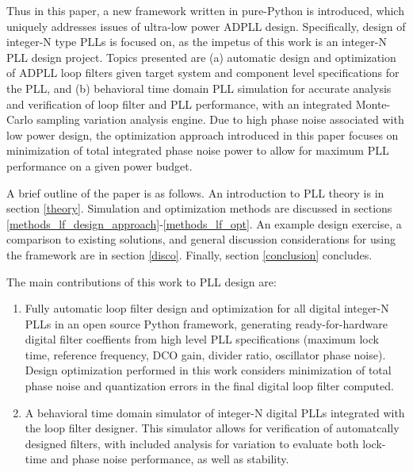 Thus in this paper, a new framework written in pure-Python is introduced, which uniquely addresses issues of ultra-low power ADPLL design. Specifically, design of integer-N type PLLs is focused on, as the impetus of this work is an integer-N PLL design project. Topics presented are (a) automatic design and optimization of ADPLL loop filters given target system and component level specifications for the PLL, and (b) behavioral time domain PLL simulation for accurate analysis and verification of loop filter and PLL performance, with an integrated Monte-Carlo sampling variation analysis engine. Due to high phase noise associated with low power design, the optimization approach introduced in this paper focuses on minimization of total integrated phase noise power to allow for maximum PLL performance on a given power budget.

A brief outline of the paper is as follows. An introduction to PLL theory is in section \ref{theory}. Simulation and optimization methods are discussed in sections \ref{methods_lf_design_approach}-\ref{methods_lf_opt}. An example design exercise, a comparison to existing solutions, and general discussion considerations for using the framework are in section \ref{disco}. Finally, section \ref{conclusion} concludes.
\vspace{1em}

The main contributions of this work to PLL design are:
\vspace{-0.8em}
\begin{enumerate}[itemsep=0pt,label=\protect\mycirc{\arabic*}]
	\setlength\itemsep{-0.8em}
	\item Fully automatic loop filter design and optimization for all digital integer-N PLLs in an open source Python framework, generating ready-for-hardware digital filter coeffients from high level PLL specifications (maximum lock time, reference frequency, DCO gain, divider ratio, oscillator phase noise). Design optimization performed in this work considers minimization of total phase noise and quantization errors in the final digital loop filter computed.
	\item A behavioral time domain simulator of integer-N digital PLLs integrated with the loop filter designer. This simulator allows for verification of automatcally designed filters, with included analysis for variation to evaluate both lock-time and phase noise performance, as well as stability.
\end{enumerate}
